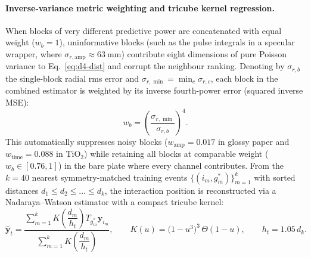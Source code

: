 \documentclass[11pt,a4paper]{article}
\begin{document}
\paragraph{Inverse-variance metric weighting and tricube kernel regression.}
When blocks of very different predictive power are concatenated with
equal weight ($w_b = 1$), uninformative blocks (such as the pulse
integrals in a specular wrapper, where $\sigma_{r,\mathrm{amp}} \approx
\SI{63}{\milli\meter}$) contribute eight dimensions of pure Poisson
variance to Eq.~\ref{eq:d4-dist} and corrupt the neighbour ranking.
Denoting by $\sigma_{r,b}$ the single-block radial rms error and
$\sigma_{r,\min} = \min_{c}\sigma_{r,c}$, each block in the combined
estimator is weighted by its inverse fourth-power error (squared
inverse MSE):
\begin{equation}
  w_b = \left(\frac{\sigma_{r,\min}}{\sigma_{r,b}}\right)^{\!4}.
  \label{eq:block-weights}
\end{equation}
This automatically suppresses noisy blocks ($w_{\mathrm{amp}} = \num{0.017}$
in glossy paper and $w_{\mathrm{time}} = \num{0.088}$ in TiO$_2$) while
retaining all blocks at comparable weight ($w_b \in [\num{0.76}, 1]$) in
the bare plate where every channel contributes.  From the $k=40$ nearest
symmetry-matched training events $\{(i_m, g^*_m)\}_{m=1}^{k}$ with
sorted distances $d_1 \le d_2 \le \dots \le d_k$, the interaction
position is reconstructed via a Nadaraya--Watson estimator with a
compact tricube kernel:
\begin{equation}
  \hat{\mathbf{y}}_t
  = \frac{\sum_{m=1}^{k} K\!\left(\dfrac{d_m}{h_t}\right) T_{g^*_m}\mathbf{y}_{i_m}}
         {\sum_{m=1}^{k} K\!\left(\dfrac{d_m}{h_t}\right)},
  \qquad
  K(u) = \bigl(1 - u^3\bigr)^3\,\Theta(1 - u),
  \qquad
  h_t = 1.05\,d_k.
  \label{eq:knn-kernel}
\end{equation}
\end{document}
